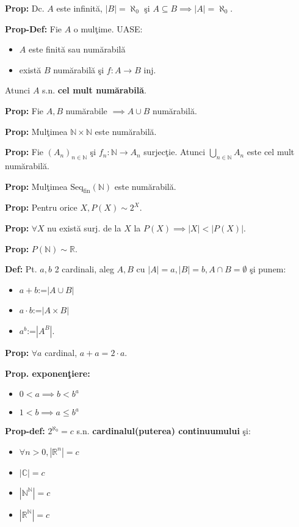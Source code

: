 \documentclass{article}
\begin{document}
\textbf{Prop:} Dc. $A$ este infinit\u a, $|B|=\aleph_0$ \c si $A\subseteq B \implies |A|=\aleph_0$.

\textbf{Prop-Def:} Fie $A$ o mul\c time. UASE:
\begin{itemize}
    \item $A$ este finit\u a sau num\u arabil\u a
    \item exist\u a $B$ num\u arabil\u a \c si $f:A\rightarrow B$ inj.
\end{itemize}
Atunci $A$ s.n. \textbf{cel mult num\u arabil\u a}.

\textbf{Prop: }Fie  $A,B$ num\u arabile $\implies A\cup B$ num\u arabil\u a.

\textbf{Prop:} Mul\c timea $\mathbb N \times \mathbb N$ este num\u arabil\u a.

\textbf{Prop:} Fie $(A_n)_{n \in \mathbb N}$ \c si $f_n: \mathbb N \rightarrow A_n$ surjec\c tie. Atunci $\bigcup_{n \in \mathbb N}A_n$ este cel mult num\u arabil\u a.

\textbf{Prop:} Mul\c timea $\text{Seq}_\text{fin}(\mathbb N)$ este num\u arabil\u a.

\textbf{Prop:} Pentru orice $X,P(X)\sim 2^X.$

\textbf{Prop:} $\forall X$ nu exist\u a surj. de la $X$ la $P(X)\implies |X|<|P(X)|$.

\textbf{Prop:} $P(\mathbb N)\sim \mathbb R$.

\textbf{Def:} Pt. $a,b$ 2 cardinali, aleg $A,B$ cu $|A|=a,|B|=b, A\cap B=\emptyset$ \c si punem:
\begin{itemize}
    \item \textbf{$a+b$}:=$|A\cup B|$
    \item \textbf{$a\cdot b$}:=$|A\times B|$
    \item \textbf{$a^b$}:=$|A^B|$.
\end{itemize}

\textbf{Prop:} $\forall a$ cardinal, $a+a=2\cdot a$.

\textbf{Prop. exponen\c tiere:}
\begin{itemize}
    \item $0<a \implies b<b^a$
    \item $1<b \implies a\leq b^a$
\end{itemize}

\textbf{Prop-def:} $2^{\aleph_0}=c$ s.n. \textbf{cardinalul(puterea) continuumului} \c si:
\begin{itemize}
    \item $\forall n>0, |\mathbb R^n|=c$
    \item $|\mathbb C|=c$
    \item $|\mathbb N^{\mathbb N}|=c$
    \item $|\mathbb R^{\mathbb N}|=c$
\end{itemize}
\end{document}
